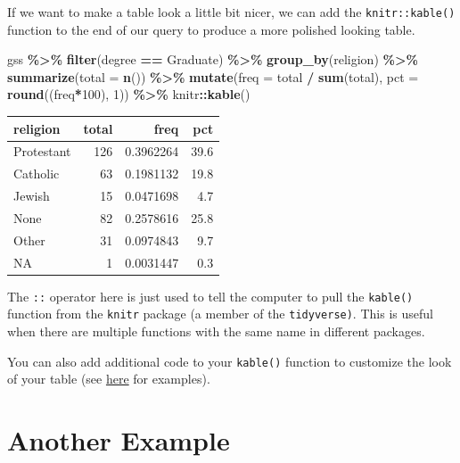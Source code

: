 \documentclass[
]{book}
\newenvironment{Shaded}{\begin{snugshade}}{\end{snugshade}}
\newcommand{\AttributeTok}[1]{\textcolor[rgb]{0.13,0.29,0.53}{#1}}
\newcommand{\DecValTok}[1]{\textcolor[rgb]{0.00,0.00,0.81}{#1}}
\newcommand{\FunctionTok}[1]{\textcolor[rgb]{0.13,0.29,0.53}{\textbf{#1}}}
\newcommand{\NormalTok}[1]{#1}
\newcommand{\SpecialCharTok}[1]{\textcolor[rgb]{0.81,0.36,0.00}{\textbf{#1}}}
\newcommand{\StringTok}[1]{\textcolor[rgb]{0.31,0.60,0.02}{#1}}
\begin{document}
If we want to make a table look a little bit nicer, we can add the \texttt{knitr::kable()} function to the end of our query to produce a more polished looking table.

\begin{Shaded}
\begin{Highlighting}[]
\NormalTok{gss }\SpecialCharTok{\%\textgreater{}\%}
  \FunctionTok{filter}\NormalTok{(degree }\SpecialCharTok{==} \StringTok{\textquotesingle{}Graduate\textquotesingle{}}\NormalTok{) }\SpecialCharTok{\%\textgreater{}\%}
  \FunctionTok{group\_by}\NormalTok{(religion) }\SpecialCharTok{\%\textgreater{}\%}
  \FunctionTok{summarize}\NormalTok{(}\AttributeTok{total =} \FunctionTok{n}\NormalTok{()) }\SpecialCharTok{\%\textgreater{}\%}
  \FunctionTok{mutate}\NormalTok{(}\AttributeTok{freq =}\NormalTok{ total }\SpecialCharTok{/} \FunctionTok{sum}\NormalTok{(total),}
         \AttributeTok{pct =} \FunctionTok{round}\NormalTok{((freq}\SpecialCharTok{*}\DecValTok{100}\NormalTok{), }\DecValTok{1}\NormalTok{)) }\SpecialCharTok{\%\textgreater{}\%}
\NormalTok{  knitr}\SpecialCharTok{::}\FunctionTok{kable}\NormalTok{()}
\end{Highlighting}
\end{Shaded}

\begin{tabular}{l|r|r|r}
\hline
religion & total & freq & pct\\
\hline
Protestant & 126 & 0.3962264 & 39.6\\
\hline
Catholic & 63 & 0.1981132 & 19.8\\
\hline
Jewish & 15 & 0.0471698 & 4.7\\
\hline
None & 82 & 0.2578616 & 25.8\\
\hline
Other & 31 & 0.0974843 & 9.7\\
\hline
NA & 1 & 0.0031447 & 0.3\\
\hline
\end{tabular}

The \texttt{::} operator here is just used to tell the computer to pull the \texttt{kable()} function from the \texttt{knitr} package (a member of the \texttt{tidyverse)}. This is useful when there are multiple functions with the same name in different packages.

You can also add additional code to your \texttt{kable()} function to customize the look of your table (see \href{https://cran.r-project.org/web/packages/kableExtra/vignettes/awesome_table_in_html.html}{here} for examples).

\hypertarget{another-example}{%
\section{Another Example}\label{another-example}}
\end{document}
